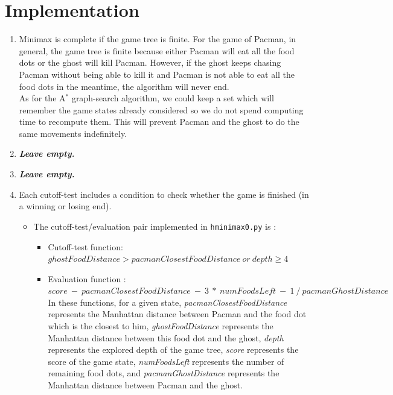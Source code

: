 \documentclass{article}
\begin{document}
\section{Implementation}

\begin{enumerate}[label=\alph*.,leftmargin=*]
    \item Minimax is complete if the game tree is finite. For the game of Pacman, in general, the game tree is finite because either Pacman will eat all the food dots or the ghost will kill Pacman. However, if the ghost keeps chasing Pacman without being able to kill it and Pacman is not able to eat all the food dots in the meantime, the algorithm will never end.\\
    As for the A$^*$ graph-search algorithm, we could keep a set which will remember the game states already considered so we do not spend computing time to recompute them. This will prevent Pacman and the ghost to do the same movements indefinitely.
    \item \textbf{\textit{Leave empty.}}
    \item \textbf{\textit{Leave empty.}}
	\item Each cutoff-test includes a condition to check whether the game is finished (in a winning or losing end).
		\begin{itemize}
			\item The cutoff-test/evaluation pair implemented in \texttt{hminimax0.py} is :
				\begin{itemize}
					\item Cutoff-test function: $ghostFoodDistance > pacmanClosestFoodDistance \ or \ depth \geq 4$
					\item Evaluation function : $score \ - \ pacmanClosestFoodDistance \ - \ 3 \ * \ numFoodsLeft \ - \ 1 \ / \ pacmanGhostDistance$\\
					
					In these functions, for a given state, \textit{pacmanClosestFoodDistance} represents the Manhattan distance between Pacman and the food dot which is the closest to him, \textit{ghostFoodDistance} represents the Manhattan distance between this food dot and the ghost, \textit{depth} represents the explored depth of the game tree, \textit{score} represents the score of the game state, \textit{numFoodsLeft} represents the number of remaining food dots, and \textit{pacmanGhostDistance} represents the Manhattan distance between Pacman and the ghost.\\
					

\end{itemize}
\end{itemize}
\end{enumerate}
\end{document}
